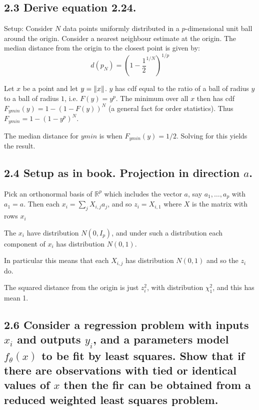 \subsection*{2.3 Derive equation 2.24.}
Setup: Consider $N$ data points uniformly distributed in a $p$-dimensional unit ball around the origin. Consider a nearest neighbour estimate at the origin. The median distance from the origin to the closest point is given by:
$$ d(p_N) = \left(1 - \frac{1}{2}^{1/N}\right)^{1/p} $$

Let $x$ be a point and let $y = \left\lVert x\right\rVert$.
$y$ has cdf equal to the ratio of a ball of radius $y$ to a ball of radius $1$, i.e. $F(y) = y^p$. The minimum over all $x$ then has cdf $F_{ymin}(y) = 1 - \left(1 - F(y)\right)^N$ (a general fact for order statistics). 
Thus $F_{ymin} = 1 - \left(1 - y^p\right)^N$.

The median distance for $ymin$ is when $F_{ymin}(y) = 1/2$. Solving for this yields the result.






\subsection*{2.4 Setup as in book. Projection in direction $a$.}

Pick an orthonormal basis of $\mathbb{R}^p$ which includes the vector $a$, say $a_1, \dots, a_p$
with $a_1 = a$. Then each $x_i = \sum_j X_{i,j} a_j$, and so $z_i = X_{i,1}$ where $X$ is the matrix with rows $x_i$

The $x_i$ have distribution $N(0, I_p)$, and under such a distribution each component of $x_i$ has distribution $N(0,1)$.

In particular this means that each $X_{i,j}$ has distribution $N(0,1)$ and so the $z_i$ do.

The squared distance from the origin is just $z_i^2$, with distribution $\chi^2_1$, and this has mean 1.







\subsection*{2.6 Consider a regression problem with inputs $x_i$ and outputs $y_i$, and a parameters model $f_\theta(x)$ to be fit by least squares. Show that if there are observations with tied or identical values of $x$ then the fir can be obtained from a reduced weighted least squares problem.}

